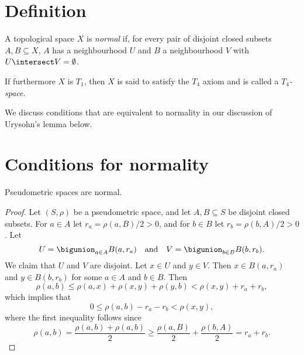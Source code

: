 \documentclass[article, a4paper, 11pt, oneside]{memoir}
\numberwithin{equation}{chapter}
\begin{document}
\section{Definition}

\begin{definition}
    A topological space $X$ is \emph{normal} if, for every pair of disjoint closed subsets $A,B \subseteq X$, $A$ has a neighbourhood $U$ and $B$ a neighbourhood $V$ with $U \intersect V = \emptyset$.

    If furthermore $X$ is $T_1$, then $X$ is said to satisfy the $T_4$ axiom and is called a \emph{$T_4$-space}.
\end{definition}

We discuss conditions that are equivalent to normality in our discussion of Urysohn's lemma below.


\section{Conditions for normality}

\begin{proposition}
    \label{thm:metric-space-normal}
    Pseudometric spaces are normal.
\end{proposition}

\begin{proof}
    Let $(S,\rho)$ be a pseudometric space, and let $A, B \subseteq S$ be disjoint closed subsets. For $a \in A$ let $r_a = \rho(a,B)/2 > 0$, and for $b \in B$ let $r_b = \rho(b,A)/2 > 0$. Let
    \begin{equation*}
        U = \bigunion_{a \in A} B(a,r_a)
        \quad \text{and} \quad
        V = \bigunion_{b \in B} B(b,r_b).
    \end{equation*}
    We claim that $U$ and $V$ are disjoint. Let $x \in U$ and $y \in V$. Then $x \in B(a,r_a)$ and $y \in B(b,r_b)$ for some $a \in A$ and $b \in B$. Then
    \begin{equation*}
        \rho(a,b)
            \leq \rho(a,x) + \rho(x,y) + \rho(y,b)
            < \rho(x,y) + r_a + r_b,
    \end{equation*}
    which implies that
    \begin{equation*}
        0
            \leq \rho(a,b) - r_a - r_b
            < \rho(x,y),
    \end{equation*}
    where the first inequality follows since
    \begin{equation*}
        \rho(a,b)
            = \frac{\rho(a,b) + \rho(a,b)}{2}
            \geq \frac{\rho(a,B)}{2} + \frac{\rho(b,A)}{2}
            = r_a + r_b.
    \end{equation*}
\end{proof}
\end{document}
